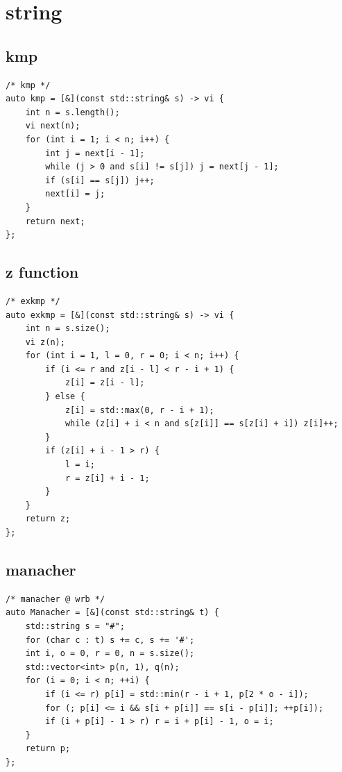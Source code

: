 \documentclass[UTF8, a4paper, titlepage, twoside]{ctexart}
\begin{document}
\section{ string }
\subsection{ kmp }
\begin{lstlisting}[style=cpp]
/* kmp */
auto kmp = [&](const std::string& s) -> vi {
    int n = s.length();
    vi next(n);
    for (int i = 1; i < n; i++) {
        int j = next[i - 1];
        while (j > 0 and s[i] != s[j]) j = next[j - 1];
        if (s[i] == s[j]) j++;
        next[i] = j;
    }
    return next;
};
\end{lstlisting}

\subsection{ z function }
\begin{lstlisting}[style=cpp]
/* exkmp */
auto exkmp = [&](const std::string& s) -> vi {
    int n = s.size();
    vi z(n);
    for (int i = 1, l = 0, r = 0; i < n; i++) {
        if (i <= r and z[i - l] < r - i + 1) {
            z[i] = z[i - l];
        } else {
            z[i] = std::max(0, r - i + 1);
            while (z[i] + i < n and s[z[i]] == s[z[i] + i]) z[i]++;
        }
        if (z[i] + i - 1 > r) {
            l = i;
            r = z[i] + i - 1;
        }
    }
    return z;
};
\end{lstlisting}

\subsection{ manacher }
\begin{lstlisting}[style=cpp]
/* manacher @ wrb */
auto Manacher = [&](const std::string& t) {
    std::string s = "#";
    for (char c : t) s += c, s += '#';
    int i, o = 0, r = 0, n = s.size();
    std::vector<int> p(n, 1), q(n);
    for (i = 0; i < n; ++i) {
        if (i <= r) p[i] = std::min(r - i + 1, p[2 * o - i]);
        for (; p[i] <= i && s[i + p[i]] == s[i - p[i]]; ++p[i]);
        if (i + p[i] - 1 > r) r = i + p[i] - 1, o = i;
    }
    return p;
};
\end{lstlisting}
\end{document}
